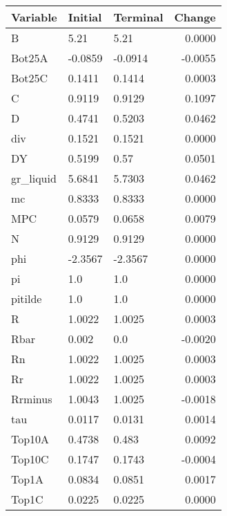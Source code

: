 \begin{table}
\centering
\label{tab:stst_comparison_low_beta_wedge_permanent_asymmetric}
\begin{tabular}{lllr}
\toprule
                Variable & Initial & Terminal &  Change \\
\midrule
                       B &    5.21 &     5.21 &  0.0000 \\
                  Bot25A & -0.0859 &  -0.0914 & -0.0055 \\
                  Bot25C &  0.1411 &   0.1414 &  0.0003 \\
                       C &  0.9119 &   0.9129 &  0.1097 \\
                       D &  0.4741 &   0.5203 &  0.0462 \\
                     div &  0.1521 &   0.1521 &  0.0000 \\
                      DY &  0.5199 &     0.57 &  0.0501 \\
               gr\_liquid &  5.6841 &   5.7303 &  0.0462 \\
                      mc &  0.8333 &   0.8333 &  0.0000 \\
                     MPC &  0.0579 &   0.0658 &  0.0079 \\
                       N &  0.9129 &   0.9129 &  0.0000 \\
                     phi & -2.3567 &  -2.3567 &  0.0000 \\
                      pi &     1.0 &      1.0 &  0.0000 \\
                 pitilde &     1.0 &      1.0 &  0.0000 \\
                       R &  1.0022 &   1.0025 &  0.0003 \\
                    Rbar &   0.002 &      0.0 & -0.0020 \\
                      Rn &  1.0022 &   1.0025 &  0.0003 \\
                      Rr &  1.0022 &   1.0025 &  0.0003 \\
                 Rrminus &  1.0043 &   1.0025 & -0.0018 \\
                     tau &  0.0117 &   0.0131 &  0.0014 \\
                  Top10A &  0.4738 &    0.483 &  0.0092 \\
                  Top10C &  0.1747 &   0.1743 & -0.0004 \\
                   Top1A &  0.0834 &   0.0851 &  0.0017 \\
                   Top1C &  0.0225 &   0.0225 &  0.0000 \\

\end{tabular}
\end{table}
